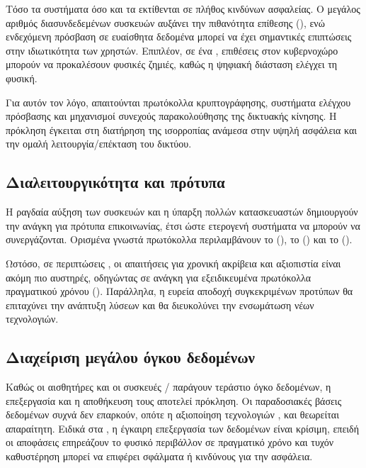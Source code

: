 Τόσο τα συστήματα  όσο και τα  εκτίθενται σε πλήθος κινδύνων ασφαλείας. Ο μεγάλος αριθμός διασυνδεδεμένων συσκευών αυξάνει την πιθανότητα επίθεσης (), ενώ ενδεχόμενη πρόσβαση σε ευαίσθητα δεδομένα μπορεί να έχει σημαντικές επιπτώσεις στην ιδιωτικότητα των χρηστών. Επιπλέον, σε ένα , επιθέσεις στον κυβερνοχώρο μπορούν να προκαλέσουν φυσικές ζημιές, καθώς η ψηφιακή διάσταση ελέγχει τη φυσική.

Για αυτόν τον λόγο, απαιτούνται πρωτόκολλα κρυπτογράφησης, συστήματα ελέγχου πρόσβασης και μηχανισμοί συνεχούς παρακολούθησης της δικτυακής κίνησης. Η πρόκληση έγκειται στη διατήρηση της ισορροπίας ανάμεσα στην υψηλή ασφάλεια και την ομαλή λειτουργία/επέκταση του δικτύου.

\subsection{Διαλειτουργικότητα και πρότυπα}

Η ραγδαία αύξηση των συσκευών και η ύπαρξη πολλών κατασκευαστών δημιουργούν την ανάγκη για πρότυπα επικοινωνίας, έτσι ώστε ετερογενή συστήματα να μπορούν να συνεργάζονται. Ορισμένα γνωστά πρωτόκολλα  περιλαμβάνουν το  (), το  () και το  ().

Ωστόσο, σε περιπτώσεις , οι απαιτήσεις για χρονική ακρίβεια και αξιοπιστία είναι ακόμη πιο αυστηρές, οδηγώντας σε ανάγκη για εξειδικευμένα πρωτόκολλα πραγματικού χρόνου (). Παράλληλα, η ευρεία αποδοχή συγκεκριμένων προτύπων θα επιταχύνει την ανάπτυξη λύσεων και θα διευκολύνει την ενσωμάτωση νέων τεχνολογιών.

\subsection{Διαχείριση μεγάλου όγκου δεδομένων}

Καθώς οι αισθητήρες και οι συσκευές / παράγουν τεράστιο όγκο δεδομένων, η επεξεργασία και η αποθήκευση τους αποτελεί πρόκληση. Οι παραδοσιακές βάσεις δεδομένων συχνά δεν επαρκούν, οπότε η αξιοποίηση τεχνολογιών ,  και  θεωρείται απαραίτητη. Ειδικά στα , η έγκαιρη επεξεργασία των δεδομένων είναι κρίσιμη, επειδή οι αποφάσεις επηρεάζουν το φυσικό περιβάλλον σε πραγματικό χρόνο και τυχόν καθυστέρηση μπορεί να επιφέρει σφάλματα ή κινδύνους για την ασφάλεια.

